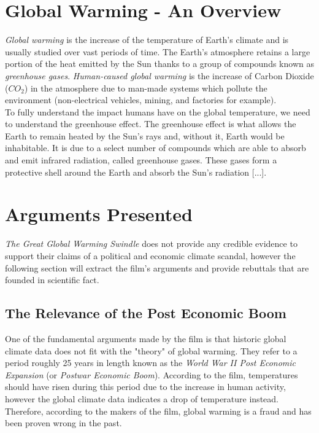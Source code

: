 \documentclass[12pt]{article}
\begin{document}
\section{Global Warming - An Overview}
	\textit{Global warming} is the increase of the temperature of Earth's climate and is usually studied over vast periods of time. The Earth's atmosphere retains a large portion of the heat emitted by the Sun thanks to a group of compounds known as \textit{greenhouse gases}. \textit{Human-caused global warming} is the increase of Carbon Dioxide ($CO_2$) in the atmosphere due to man-made systems which pollute the environment (non-electrical vehicles, mining, and factories for example). \\
	
	To fully understand the impact humans have on the global temperature, we need to understand the greenhouse effect. The greenhouse effect is what allows the Earth to remain heated by the Sun's rays and, without it, Earth would be inhabitable. It is due to a select number of compounds which are able to absorb and emit infrared radiation, called greenhouse gases. These gases form a protective shell around the Earth and absorb the Sun's radiation [...]. \\
	
\section{Arguments Presented}
    \textit{The Great Global Warming Swindle} does not provide any credible evidence to support their claims of a political and economic climate scandal, however the following section will extract the film's arguments and provide rebuttals that are founded in scientific fact.
    
\subsection{The Relevance of the Post Economic Boom}
    One of the fundamental arguments made by the film is that historic global climate data does not fit with the "theory" of global warming. They refer to a period roughly 25 years in length known as the \textit{World War II Post Economic Expansion} (or \textit{Postwar Economic Boom}). According to the film, temperatures should have risen during this period due to the increase in human activity, however the global climate data indicates a drop of temperature instead. Therefore, according to the makers of the film, global warming is a fraud and has been proven wrong in the past.\\
    
\end{document}
